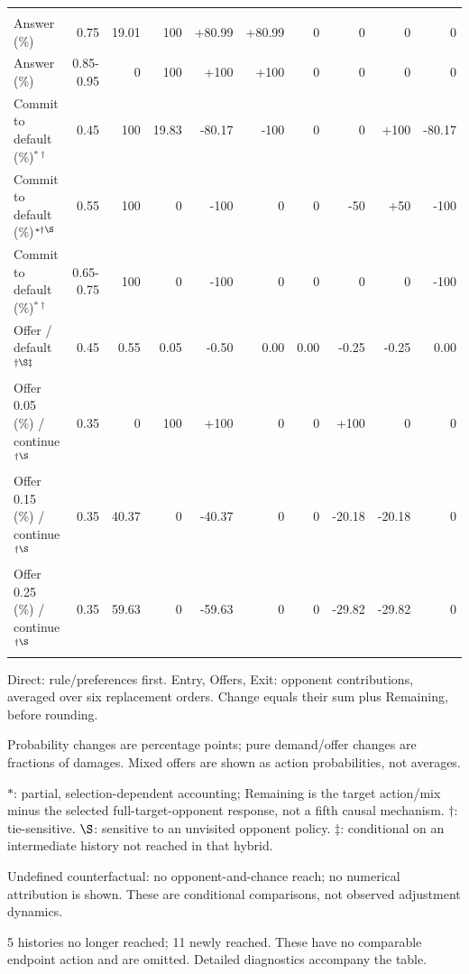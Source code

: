 \documentclass[10pt]{article}
\begin{document}
{\begin{longtable}{@{}>{\raggedright\arraybackslash}p{1.65in}rrrrrrrrr@{}}
\multicolumn{10}{@{}l}{\textbf{Defendant}}\\
Answer (\%) & 0.75 & 19.01 & 100 & +80.99 & +80.99 & 0 & 0 & 0 & 0\\
Answer (\%) & 0.85-0.95 & 0 & 100 & +100 & +100 & 0 & 0 & 0 & 0\\
Commit to default (\%)$^{*\dagger}$ & 0.45 & 100 & 19.83 & -80.17 & -100 & 0 & 0 & +100 & -80.17\\
Commit to default (\%)$^{*\dagger\S}$ & 0.55 & 100 & 0 & -100 & 0 & 0 & -50 & +50 & -100\\
Commit to default (\%)$^{*\dagger}$ & 0.65-0.75 & 100 & 0 & -100 & 0 & 0 & 0 & 0 & -100\\
Offer / default$^{\dagger\S\ddagger}$ & 0.45 & 0.55 & 0.05 & -0.50 & 0.00 & 0.00 & -0.25 & -0.25 & 0.00\\
Offer 0.05 (\%) / continue$^{\dagger\S}$ & 0.35 & 0 & 100 & +100 & 0 & 0 & +100 & 0 & 0\\
Offer 0.15 (\%) / continue$^{\dagger\S}$ & 0.35 & 40.37 & 0 & -40.37 & 0 & 0 & -20.18 & -20.18 & 0\\
Offer 0.25 (\%) / continue$^{\dagger\S}$ & 0.35 & 59.63 & 0 & -59.63 & 0 & 0 & -29.82 & -29.82 & 0\\
\end{longtable}}
{\footnotesize Direct: rule/preferences first. Entry, Offers, Exit: opponent contributions, averaged over six replacement orders. Change equals their sum plus Remaining, before rounding.\par
Probability changes are percentage points; pure demand/offer changes are fractions of damages. Mixed offers are shown as action probabilities, not averages.\par
$*$: partial, selection-dependent accounting; Remaining is the target action/mix minus the selected full-target-opponent response, not a fifth causal mechanism. $\dagger$: tie-sensitive. $\S$: sensitive to an unvisited opponent policy. $\ddagger$: conditional on an intermediate history not reached in that hybrid.\par
Undefined counterfactual: no opponent-and-chance reach; no numerical attribution is shown. These are conditional comparisons, not observed adjustment dynamics.\par
5 histories no longer reached; 11 newly reached. These have no comparable endpoint action and are omitted. Detailed diagnostics accompany the table.}\par
{}\par
\end{document}
